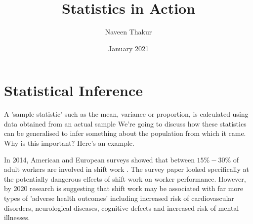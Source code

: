 \documentclass[a4paper,twosided,notoc]{tufte-book}
\author{Naveen Thakur}
\title{Statistics in Action}
\date{January 2021}
\begin{document}
\maketitle
\begin{fullwidth}
	\tableofcontents
\end{fullwidth}


\chapter{Statistical Inference}
A 'sample statistic' such as the mean, variance or proportion, is calculated using data obtained from an actual sample 
We're going to discuss how these statistics can be generalised to infer something about the population from which it came. Why is this important? Here's an example.

In 2014, American and European surveys showed that between $15\%-30\%$ of adult workers are involved in shift work . The survey paper looked specifically at the potentially dangerous effects of shift work on worker performance. However, by 2020 research is suggesting that shift work may be associated with far more types of 'adverse health outcomes' including increased risk of cardiovascular disorders, neurological diseases, cognitive defects and increased risk of mental illnesses.
\end{document}
